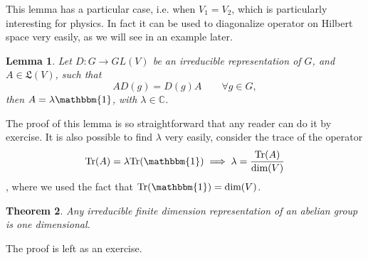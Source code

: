 \documentclass[12pt]{book}
\theoremstyle{plain}
\newcommand{\I}{\mathbbm{1}}
\newcommand{\C}{\mathbb{C}}
\newtheorem{thm}{Theorem}[section]
\newtheorem{lem}[thm]{Lemma}
\theoremstyle{definition}
\theoremstyle{remark}
\begin{document}
This lemma has a particular case, i.e. when $V_1=V_2$, which is particularly interesting for physics. In fact it can be used to diagonalize operator on Hilbert space very easily, as we will see in an example later. 
\begin{lem}\label{lemmafigo}
Let $D:G\to GL(V)$ be an irreducible representation of $G$, and $A\in \mathfrak{L}(V)$, such that
\[AD(g) = D(g)A \qquad \forall g \in G,\]
then $A=\lambda \I$, with $\lambda \in \C$.
\end{lem}
The proof of this lemma is so straightforward that any reader can do it by exercise. It is also possible to find $\lambda$ very easily, consider the trace of the operator 
\[\text{Tr}(A) = \lambda \text{Tr}(\I)\implies \lambda = \frac{\text{Tr}(A)}{\text{dim}(V)}\],
where we used the fact that $\text{Tr}(\I) = \text{dim}(V)$.
\begin{thm}
Any irreducible finite dimension representation of an abelian group is one dimensional.
\end{thm}
The proof is left as an exercise.
\end{document}
